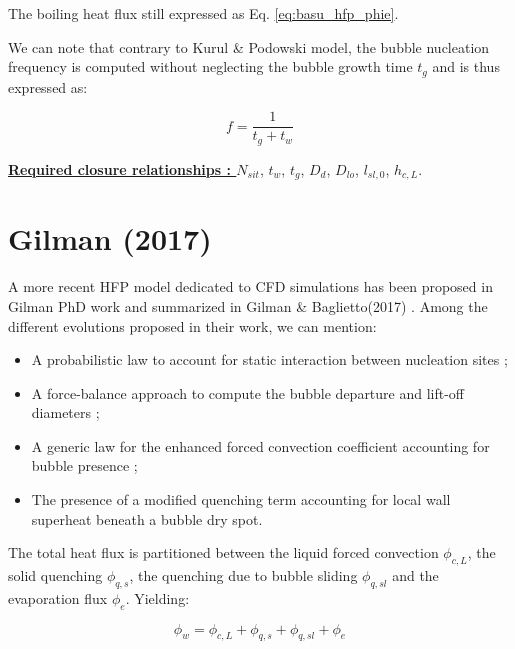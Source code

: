 The boiling heat flux still expressed as Eq. \ref{eq:basu_hfp_phie}.

\npar

\begin{remark*}{}
We can note that contrary to  Kurul \& Podowski model, the bubble nucleation frequency is computed without neglecting the bubble growth time $t_{g}$ and is thus expressed as:

\begin{equation}
f = \dfrac{1}{t_{g} + t_{w}}
\end{equation}
\end{remark*}

\textbf{\underline{Required closure relationships : }} $N_{sit}$, $t_{w}$, $t_{g}$, $D_{d}$, $D_{lo}$, $l_{sl,0}$, $h_{c,L}$. 



\section{Gilman (2017)}

A more recent HFP model dedicated to CFD simulations has been proposed in Gilman PhD work \cite{gilman_phd} and summarized in Gilman \& Baglietto(2017) \cite{gilman2017}. Among the different evolutions proposed in their work, we can mention:

\begin{itemize}
\item A probabilistic law to account for static interaction between nucleation sites ;
\item A force-balance approach to compute the bubble departure and lift-off diameters ;
\item A generic law for the enhanced forced convection coefficient accounting for bubble presence ; 
\item The presence of a modified quenching term accounting for local wall superheat beneath a bubble dry spot.
\end{itemize}

The total heat flux is partitioned between the liquid forced convection $\phi_{c,L}$, the solid quenching $\phi_{q,s}$, the quenching due to bubble sliding $\phi_{q,sl}$ and the evaporation flux $\phi_{e}$. Yielding:

\begin{equation}
\phi_{w} = \phi_{c,L} + \phi_{q,s} + \phi_{q,sl} + \phi_{e}
\label{eq:gilman_hfp_phiw}
\end{equation} 

